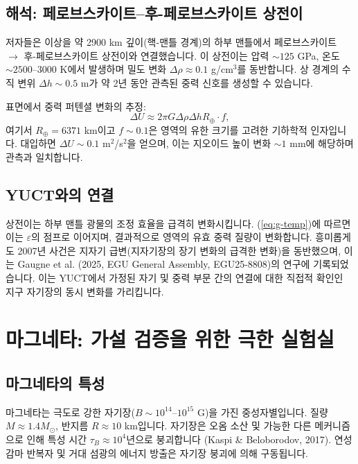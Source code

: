 \documentclass[11pt,a4paper]{article}
\newcommand{\eps}{\varepsilon}
\begin{document}
	\subsection{해석: 페로브스카이트–후-페로브스카이트 상전이}
	\label{subsec:grace-interpretation}
	
	저자들은 이상을 약 2900 km 깊이(핵-맨틀 경계)의 하부 맨틀에서 페로브스카이트 $\rightarrow$ 후-페로브스카이트 상전이와 연결했습니다. 이 상전이는 압력 $\sim 125$ GPa, 온도 $\sim 2500$–$3000$ K에서 발생하며 밀도 변화 $\Delta\rho \approx 0.1$ g/cm$^3$를 동반합니다. 상 경계의 수직 변위 $\Delta h \sim 0.5$ m가 약 2년 동안 관측된 중력 신호를 생성할 수 있습니다.
	
	표면에서 중력 퍼텐셜 변화의 추정:
	\begin{equation}
		\Delta U \approx 2\pi G \Delta\rho \Delta h R_\oplus \cdot f,
		\label{eq:delta-u}
	\end{equation}
	여기서 $R_\oplus = 6371$ km이고 $f \sim 0.1$은 영역의 유한 크기를 고려한 기하학적 인자입니다. 대입하면 $\Delta U \sim 0.1$ m$^2$/s$^2$을 얻으며, 이는 지오이드 높이 변화 $\sim 1$ mm에 해당하며 관측과 일치합니다.
	
	\subsection{YUCT와의 연결}
	\label{subsec:grace-yuct}
	
	상전이는 하부 맨틀 광물의 조정 효율을 급격히 변화시킵니다. (\ref{eq:g-temp})에 따르면 이는 $\eps$의 점프로 이어지며, 결과적으로 영역의 유효 중력 질량이 변화합니다. 흥미롭게도 2007년 사건은 지자기 급변(지자기장의 장기 변화의 급격한 변화)을 동반했으며, 이는 Gaugne et al. (2025, EGU General Assembly, EGU25-8808)의 연구에 기록되었습니다. 이는 YUCT에서 가정된 자기 및 중력 부문 간의 연결에 대한 직접적 확인인 지구 자기장의 동시 변화를 가리킵니다.
	
	\section{마그네타: 가설 검증을 위한 극한 실험실}
	\label{sec:magnetars}
	
	\subsection{마그네타의 특성}
	\label{subsec:magnetars-properties}
	
	마그네타는 극도로 강한 자기장($B \sim 10^{14}$–$10^{15}$ G)을 가진 중성자별입니다. 질량 $M \approx 1.4 M_\odot$, 반지름 $R \approx 10$ km입니다. 자기장은 오옴 소산 및 가능한 다른 메커니즘으로 인해 특성 시간 $\tau_B \approx 10^4$년으로 붕괴합니다 (Kaspi \& Beloborodov, 2017). 연성 감마 반복자 및 거대 섬광의 에너지 방출은 자기장 붕괴에 의해 구동됩니다.
	
\end{document}
